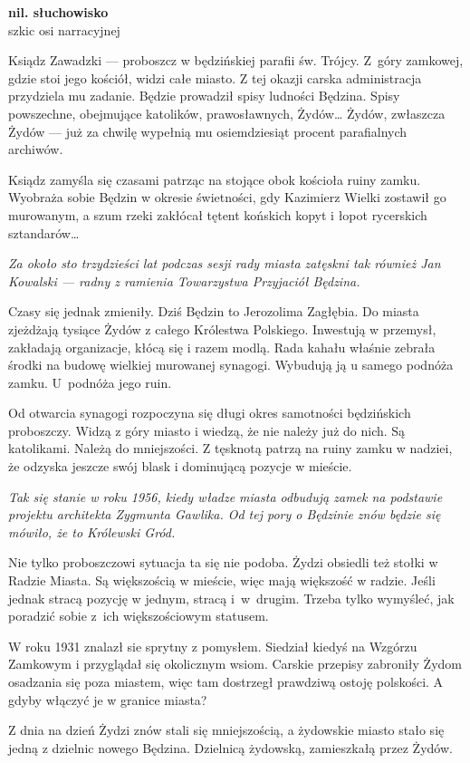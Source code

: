 \documentclass[11pt,a4paper,oneside]{article}
\begin{document}
\noindent
\textbf{nil. słuchowisko}\\
szkic osi narracyjnej

\noindent
Ksiądz Zawadzki --- proboszcz w będzińskiej parafii św. Trójcy.
Z~góry zamkowej, gdzie stoi jego kościół, widzi całe miasto.  Z tej
okazji carska administracja przydziela mu zadanie. Będzie prowadził
spisy ludności Będzina.  Spisy powszechne, obejmujące katolików,
prawosławnych, Żydów\dots{} Żydów, zwłaszcza Żydów --- już za chwilę
wypełnią mu osiemdziesiąt procent parafialnych archiwów. 

Ksiądz zamyśla się czasami patrząc na stojące obok kościoła ruiny
zamku.  Wyobraża sobie Będzin w okresie świetności, gdy Kazimierz
Wielki zostawił go murowanym, a szum rzeki zakłócał tętent końskich
kopyt i łopot rycerskich sztandarów\dots{}

\footnotesize{\emph{Za  około sto trzydzieści lat podczas sesji rady
miasta zatęskni tak również Jan Kowalski --- radny z ramienia
Towarzystwa Przyjaciół Będzina.}}

\normalsize
Czasy się jednak zmieniły. Dziś Będzin to Jerozolima Zagłębia. Do miasta
zjeżdżają tysiące Żydów z całego Królestwa Polskiego. Inwestują
w przemysł, zakładają organizacje, kłócą się i razem modlą. Rada
kahału właśnie zebrała środki na budowę wielkiej murowanej synagogi.
Wybudują ją u samego podnóża zamku. U~podnóża jego ruin.

Od otwarcia synagogi rozpoczyna się długi okres samotności będzińskich
proboszczy. Widzą z góry miasto i wiedzą, że nie należy już do nich.
Są katolikami. Należą do mniejszości. Z tęsknotą patrzą na ruiny zamku w nadziei,
że odzyska jeszcze swój blask i dominującą pozycje w mieście. 

\footnotesize{\emph{Tak się stanie w roku 1956, kiedy władze miasta
odbudują zamek na podstawie projektu architekta Zygmunta Gawlika. Od
tej pory o Będzinie znów będzie się mówiło, że to Królewski Gród.}}

\normalsize
Nie tylko proboszczowi sytuacja ta się nie podoba. Żydzi obsiedli też
stołki w Radzie Miasta. Są większością w mieście, więc mają większość
w radzie. Jeśli jednak stracą pozycję w jednym, stracą i~w~drugim. Trzeba
tylko wymyśleć, jak poradzić sobie z~ich większościowym statusem. 

W roku 1931 znalazł sie sprytny z pomysłem. Siedział kiedyś na Wzgórzu Zamkowym
i przyglądał się okolicznym wsiom. Carskie przepisy zabroniły Żydom 
osadzania się poza miastem, więc tam dostrzegł prawdziwą ostoję 
polskości. A gdyby włączyć je w granice miasta? 

Z dnia na dzień Żydzi znów stali się mniejszością, a żydowskie miasto
stało się jedną z dzielnic nowego Będzina. Dzielnicą żydowską, zamieszkałą
przez Żydów.
\end{document}
